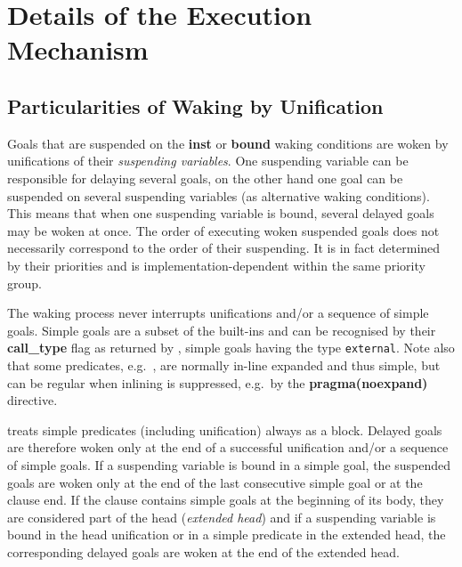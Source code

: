 \section{Details of the Execution Mechanism}

\subsection{Particularities of Waking by Unification}
Goals that are suspended on the {\bf inst} or {\bf bound} waking
conditions are woken by unifications of their
{\it suspending variables}.
One suspending variable can be responsible for delaying several goals,
on the other hand one goal can be suspended on several
suspending variables (as alternative waking conditions).
This means that when one suspending variable is bound,
several delayed goals may be woken at once.
The order of executing woken suspended goals does not necessarily correspond
to the order of their suspending. It is in fact determined by their
priorities and is implementation-dependent within the same priority group.

The waking process never interrupts unifications and/or a sequence
of simple goals.
Simple goals are a subset of the built-ins and
can be recognised by their {\bf call_type}
flag as returned by
,
simple goals having the type {\tt external}.
Note also that some predicates, e.g.\ ,
are normally in-line expanded and thus simple, but can be regular when
inlining is suppressed, e.g.\ by the {\bf pragma(noexpand)} directive.

{\eclipse} treats simple predicates (including unification) always as a block.
Delayed goals are therefore woken only at the end of a successful
unification and/or a sequence of simple goals.
If a suspending variable is bound in a simple goal, the suspended
goals are woken only at the end of the last consecutive simple
goal or at the clause end.
If the clause contains simple goals at the beginning of its
body, they are considered part of the head ({\it extended head})
and if a suspending variable is bound in the head unification or
in a simple predicate in the extended head, the corresponding
delayed goals are woken at the end of the extended head.

